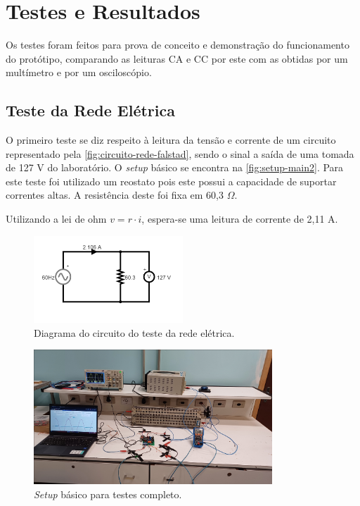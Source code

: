 
\chapter{Testes e Resultados}\label{cap:resultados}

Os testes foram feitos para prova de conceito e demonstração do funcionamento do protótipo, comparando as leituras \gls{CA} e \gls{CC} por este com as obtidas por um multímetro e por um osciloscópio.

\section{Teste da Rede Elétrica}\label{sec:l-rede}

O primeiro teste se diz respeito à leitura da tensão e corrente de um circuito representado pela \autoref{fig:circuito-rede-falstad}, sendo o sinal a saída de uma tomada de 127 V do laboratório. O \textit{setup} básico se encontra na \autoref{fig:setup-main2}. Para este teste foi utilizado um reostato pois este possui a capacidade de suportar correntes altas. A resistência deste foi fixa em 60,3 $\Omega$.

Utilizando a lei de ohm $v = r \cdot  i$, espera-se uma leitura de corrente de 2,11 A.

\begin{figure}[htb!]
    \caption{Diagrama do circuito do teste da rede elétrica.}
    \label{fig:circuito-rede-falstad}
    \includegraphics[width=0.5\textwidth]{figuras/circ-rede-falstad.png}
    \fonte{}
\end{figure}

\begin{figure}[htb!]
    \caption{\textit{Setup} básico para testes completo.}
    \label{fig:setup-main2}
    \includegraphics[width=0.8\textwidth]{figuras/setup-basico-full.png}
    \fonte{}
\end{figure}

